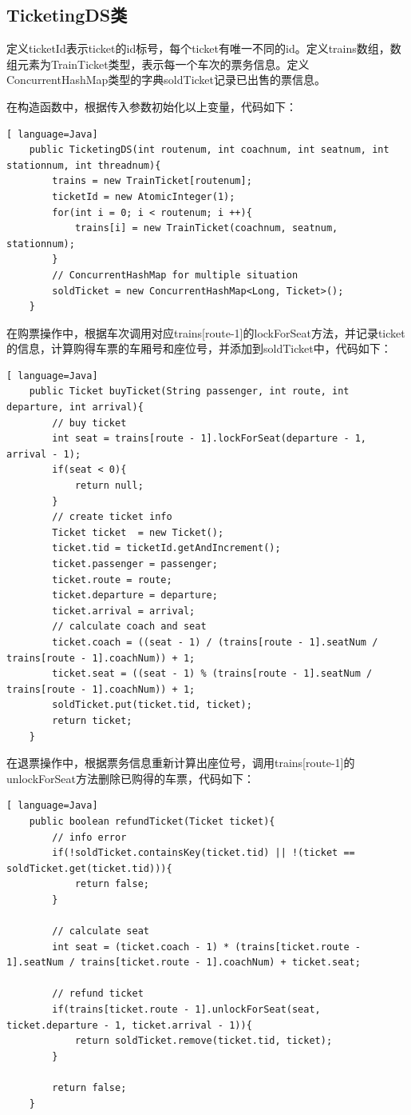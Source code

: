 \documentclass{article}
\begin{document}
\subsection{TicketingDS类}
定义ticketId表示ticket的id标号，每个ticket有唯一不同的id。定义trains数组，数组元素为TrainTicket类型，表示每一个车次的票务信息。定义ConcurrentHashMap类型的字典soldTicket记录已出售的票信息。\par
在构造函数中，根据传入参数初始化以上变量，代码如下：\par
\begin{lstlisting}[ language=Java]
    public TicketingDS(int routenum, int coachnum, int seatnum, int stationnum, int threadnum){
        trains = new TrainTicket[routenum];
        ticketId = new AtomicInteger(1);
        for(int i = 0; i < routenum; i ++){
            trains[i] = new TrainTicket(coachnum, seatnum, stationnum);
        }
        // ConcurrentHashMap for multiple situation
        soldTicket = new ConcurrentHashMap<Long, Ticket>();
    }
\end{lstlisting}\par
在购票操作中，根据车次调用对应trains[route-1]的lockForSeat方法，并记录ticket的信息，计算购得车票的车厢号和座位号，并添加到soldTicket中，代码如下：\par
\begin{lstlisting}[ language=Java]
    public Ticket buyTicket(String passenger, int route, int departure, int arrival){
        // buy ticket
        int seat = trains[route - 1].lockForSeat(departure - 1, arrival - 1);
        if(seat < 0){
            return null;
        }
        // create ticket info
        Ticket ticket  = new Ticket();
        ticket.tid = ticketId.getAndIncrement();
        ticket.passenger = passenger;
        ticket.route = route;
        ticket.departure = departure;
        ticket.arrival = arrival;
        // calculate coach and seat
        ticket.coach = ((seat - 1) / (trains[route - 1].seatNum / trains[route - 1].coachNum)) + 1;
        ticket.seat = ((seat - 1) % (trains[route - 1].seatNum / trains[route - 1].coachNum)) + 1;
        soldTicket.put(ticket.tid, ticket);
        return ticket;
    }
\end{lstlisting}\par
在退票操作中，根据票务信息重新计算出座位号，调用trains[route-1]的unlockForSeat方法删除已购得的车票，代码如下：\par
\begin{lstlisting}[ language=Java]
    public boolean refundTicket(Ticket ticket){
        // info error
        if(!soldTicket.containsKey(ticket.tid) || !(ticket == soldTicket.get(ticket.tid))){
            return false;
        }

        // calculate seat
        int seat = (ticket.coach - 1) * (trains[ticket.route - 1].seatNum / trains[ticket.route - 1].coachNum) + ticket.seat;

        // refund ticket
        if(trains[ticket.route - 1].unlockForSeat(seat, ticket.departure - 1, ticket.arrival - 1)){
            return soldTicket.remove(ticket.tid, ticket);
        }

        return false;
    }
\end{lstlisting}\par
\end{document}
